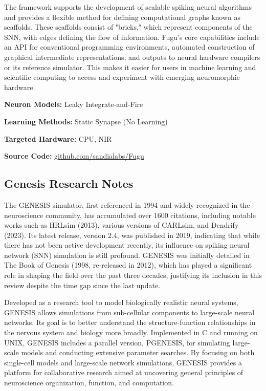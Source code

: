 The framework supports the development of scalable spiking neural algorithms and provides a flexible method for defining computational graphs known as scaffolds. These scaffolds consist of "bricks," which represent components of the SNN, with edges defining the flow of information. Fugu’s core capabilities include an API for conventional programming environments, automated construction of graphical intermediate representations, and outputs to neural hardware compilers or its reference simulator. This makes it easier for users in machine learning and scientific computing to access and experiment with emerging neuromorphic hardware.

\begin{tcolorbox}[enhanced,attach boxed title to top center={yshift=-3mm,yshifttext=-1mm}, colback=blue!5!white,colframe=blue!75!black,colbacktitle=red!80!black, title=Fugu at a Glance,fonttitle=\bfseries, boxed title style={size=small,colframe=red!50!black} ]

\textbf{Neuron Models:} Leaky Integrate-and-Fire

\textbf{Learning Methods:} Static Synapse (No Learning)  

\textbf{Targeted Hardware:} CPU, NIR 

\textbf{Source Code:} \href{https://github.com/sandialabs/Fugu}{github.com/sandialabs/Fugu}
\end{tcolorbox}
\subsection*{Genesis Research Notes}\label{Genesis}

The GENESIS simulator, first referenced in 1994 and widely recognized in the neuroscience community, has accumulated over 1600 citations, including notable works such as HRLsim (2013), various versions of CARLsim, and Dendrify (2023). Its latest release, version 2.4, was published in 2019, indicating that while there has not been active development recently, its influence on spiking neural network (SNN) simulation is still profound. GENESIS was initially detailed in The Book of Genesis (1998, re-released in 2012), which has played a significant role in shaping the field over the past three decades, justifying its inclusion in this review despite the time gap since the last update.

Developed as a research tool to model biologically realistic neural systems, GENESIS allows simulations from sub-cellular components to large-scale neural networks. Its goal is to better understand the structure-function relationships in the nervous system and biology more broadly. Implemented in C and running on UNIX, GENESIS includes a parallel version, PGENESIS, for simulating large-scale models and conducting extensive parameter searches. By focusing on both single-cell models and large-scale network simulations, GENESIS provides a platform for collaborative research aimed at uncovering general principles of neuroscience organization, function, and computation.

